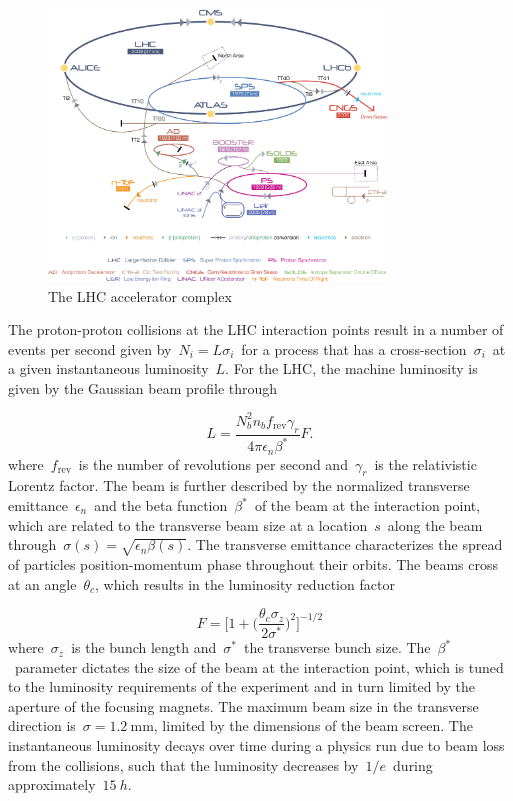 \begin{figure}
\begin{centering}
\includegraphics[width=0.8\textwidth]{figures/exp/accelerators.jpg}
\caption{The LHC accelerator complex}
\label{fig:lhc_accelerators}
\end{centering}
\end{figure}

The proton-proton collisions at the LHC interaction points result in a number of events per second given by~$N_i = L \sigma_i$~for a process that has a cross-section~$\sigma_i$~at a given instantaneous luminosity~$L$. For the LHC, the machine luminosity is given by the Gaussian beam profile through

\begin{equation}
L = \frac{N_b^2 n_b f_\mathrm{rev} \gamma_r}{4 \pi \epsilon_n \beta^*} F.
\end{equation}
where~$f_{\mathrm{rev}}$~is the number of revolutions per second and~$\gamma_r$~is the relativistic Lorentz factor. The beam is further described by the normalized transverse emittance~$\epsilon_n$~and the beta function~$\beta^*$~of the beam at the interaction point, which are related to the transverse beam size at a location~$s$~along the beam through~$\sigma(s) = \sqrt{\epsilon_n \beta(s)}$. The transverse emittance characterizes the spread of particles position-momentum phase throughout their orbits. The beams cross at an angle~$\theta_c$, which results in the luminosity reduction factor

\begin{equation}
F = \biggl[1 + \bigr( \frac{\theta_c \sigma_z}{2 \sigma^*} \bigr)^2 \biggr]^{-1/2}
\end{equation}
where~$\sigma_z$~is the bunch length and~$\sigma^*$~the transverse bunch size. The~$\beta^*$~parameter dictates the size of the beam at the interaction point, which is tuned to the luminosity requirements of the experiment and in turn limited by the aperture of the focusing magnets. The maximum beam size in the transverse direction is~$\sigma=1.2~\mathrm{mm}$, limited by the dimensions of the beam screen. The instantaneous luminosity decays over time during a physics run due to beam loss from the collisions, such that the luminosity decreases by~$1/e$~during approximately~$15\ h$.

